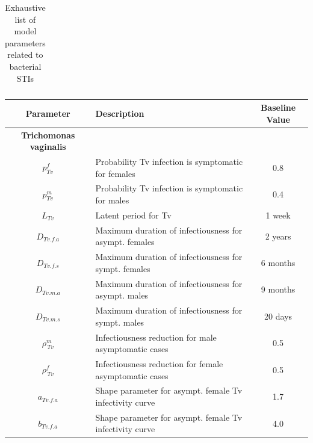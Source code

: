 \documentclass[11pt, onecolumn]{article}
\begin{document}
\begin{table}[htdp]
\begin{scriptsize}
\begin{center}
\begin{tabular}{|clc|}
\hline


\end{tabular}
\caption{Exhaustive list of model parameters related to bacterial STIs}
\label{tab:STIAllParamBacteria}
\end{center}
\end{scriptsize}
\end{table}


\renewcommand{\arraystretch}{1.25}
\begin{table}[htdp]

\begin{scriptsize} %

\begin{center}
\begin{tabular}{|clc|}
\hline
\textbf{Parameter}  & \textbf{Description} & \textbf{Baseline Value}\\
\hline
\hline
\textbf{Trichomonas vaginalis} & & \\
\hline

$p^f_{Tv}$ & Probability Tv infection is symptomatic for females & 0.8 \\
$p^m_{Tv}$ & Probability Tv infection is symptomatic for males & 0.4 \\

$L_{Tv}$ & Latent period for Tv & 1 week \\

$D_{Tv.f.a}$ & Maximum duration of infectiousness for asympt. females & 2 years \\
$D_{Tv.f.s}$ & Maximum duration of infectiousness for sympt. females & 6 months\\

$D_{Tv.m.a}$ & Maximum duration of infectiousness for asympt. males & 9 months \\
$D_{Tv.m.s}$ & Maximum duration of infectiousness for sympt. males & 20 days \\

$\rho_{\,Tv}^m$ & Infectiousness reduction for male asymptomatic cases & 0.5\\
$\rho_{\,Tv}^f$ & Infectiousness reduction for female asymptomatic cases & 0.5\\


$a_{Tv.f.a}$ & Shape parameter for asympt. female Tv infectivity curve & 1.7\\
$b_{Tv.f.a}$ & Shape parameter for asympt. female Tv infectivity curve & 4.0\\


\end{tabular}
\end{center}
\end{scriptsize}
\end{table}
\end{document}
